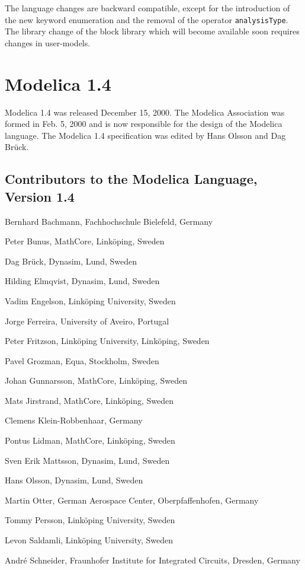 The language changes are backward compatible, except for the introduction of the new keyword enumeration and the removal of the operator \lstinline!analysisType!.  The library change of the block library which will become available soon requires changes in user-models.

\section{Modelica 1.4}\label{modelica-1-4}

Modelica 1.4 was released December 15, 2000. The Modelica Association
was formed in Feb. 5, 2000 and is now responsible for the design of the
Modelica language. The Modelica 1.4 specification was edited by Hans
Olsson and Dag Brück.

\subsection{Contributors to the Modelica Language, Version 1.4}\label{contributors-to-the-modelica-language-version-1-4}
\indent\indent
Bernhard Bachmann, Fachhochschule Bielefeld, Germany

Peter Bunus, MathCore, Linköping, Sweden

Dag Brück, Dynasim, Lund, Sweden

Hilding Elmqvist, Dynasim, Lund, Sweden

Vadim Engelson, Linköping University, Sweden

Jorge Ferreira, University of Aveiro, Portugal

Peter Fritzson, Linköping University, Linköping, Sweden

Pavel Grozman, Equa, Stockholm, Sweden

Johan Gunnarsson, MathCore, Linköping, Sweden

Mats Jirstrand, MathCore, Linköping, Sweden

Clemens Klein-Robbenhaar, Germany

Pontus Lidman, MathCore, Linköping, Sweden

Sven Erik Mattsson, Dynasim, Lund, Sweden

Hans Olsson, Dynasim, Lund, Sweden

Martin Otter, German Aerospace Center, Oberpfaffenhofen, Germany

Tommy Persson, Linköping University, Sweden

Levon Saldamli, Linköping University, Sweden

André Schneider, Fraunhofer Institute for Integrated Circuits, Dresden,
Germany

